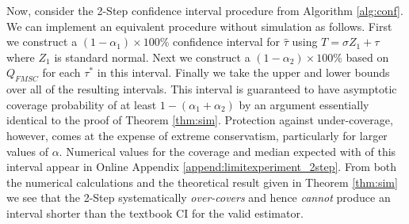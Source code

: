 Now, consider the 2-Step confidence interval procedure from Algorithm \ref{alg:conf}.
We can implement an equivalent procedure without simulation as follows.
First we construct a $(1-\alpha_1)\times 100\%$ confidence interval for $\widehat{\tau}$ using $T = \sigma Z_1 + \tau$ where $Z_1$ is standard normal.
Next we construct a $(1-\alpha_2)\times 100\%$ based on $Q_{FMSC}$ for each $\tau^*$ in this interval.
Finally we take the upper and lower bounds over all of the resulting intervals.
This interval is guaranteed to have asymptotic coverage probability of at least $1 - (\alpha_1 + \alpha_2)$ by an argument essentially identical to the proof of Theorem \ref{thm:sim}.
Protection against under-coverage, however, comes at the expense of extreme conservatism, particularly for larger values of $\alpha$.
Numerical values for the coverage and median expected with of this interval appear in Online Appendix \ref{append:limitexperiment_2step}. 
From both the numerical calculations and the theoretical result given in Theorem \ref{thm:sim} we see that the 2-Step systematically \emph{over-covers} and hence \emph{cannot} produce an interval shorter than the textbook CI for the valid estimator.

